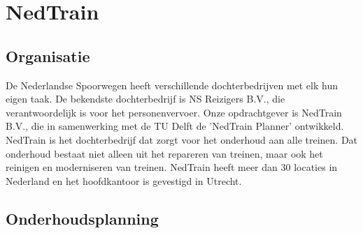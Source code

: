\section{NedTrain}

\subsection{Organisatie}
De Nederlandse Spoorwegen heeft verschillende dochterbedrijven met elk hun eigen taak. De bekendste dochterbedrijf is NS Reizigers B.V., die verantwoordelijk is voor het personenvervoer. Onze opdrachtgever is NedTrain B.V., die in samenwerking met de TU Delft de 'NedTrain Planner' ontwikkeld. NedTrain is het dochterbedrijf dat zorgt voor het onderhoud aan alle treinen. Dat onderhoud bestaat niet alleen uit het repareren van treinen, maar ook het reinigen en moderniseren van treinen. NedTrain heeft meer dan 30 locaties in Nederland en het hoofdkantoor is gevestigd in Utrecht. 

\subsection{Onderhoudsplanning}
